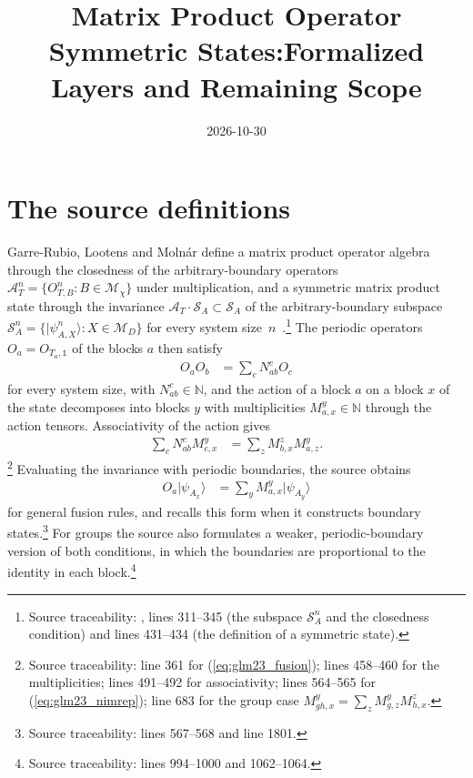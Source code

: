 \documentclass{article}
\title{Matrix Product Operator Symmetric States:\newline Formalized Layers and Remaining Scope}
\author{}
\date{2026-10-30}
\begin{document}
\maketitle
{}

\section{The source definitions}
Garre-Rubio, Lootens and Moln\'ar define a matrix product operator
algebra through the closedness of the arbitrary-boundary operators
$\mathcal A_T^n=\{O^n_{T,B}: B\in\mathcal M_\chi\}$ under multiplication,
and a symmetric matrix product state through the invariance
$\mathcal A_T\cdot\mathcal S_A\subset\mathcal S_A$ of the arbitrary-boundary
subspace $\mathcal S_A^n=\{\lvert\psi^n_{A,X}\rangle: X\in\mathcal M_D\}$ for every
system size~$n$~\cite{GarreRubio2023MPOSym}.\footnote{Source traceability:
    , lines 311--345 (the subspace
    $\mathcal S_A^n$ and the closedness condition) and lines 431--434
    (the definition of a symmetric state).}
The periodic operators $O_a=O_{T_a,\mathbb 1}$ of the blocks $a$ then
satisfy
\begin{align}
    O_aO_b & =\sum_c N_{ab}^c O_c
    \label{eq:glm23_fusion}
\end{align}
for every system size, with $N_{ab}^c\in\mathbb N$, and the action of a block
$a$ on a block $x$ of the state decomposes into blocks $y$ with multiplicities
$M_{a,x}^y\in\mathbb N$ through the action tensors. Associativity of the action
gives
\begin{align}
    \sum_c N_{ab}^c M_{c,x}^y & =\sum_z M_{b,x}^z M_{a,z}^y .
    \label{eq:glm23_nimrep}
\end{align}
\footnote{Source traceability: line 361 for
    (\ref{eq:glm23_fusion}); lines 458--460 for the multiplicities; lines
    491--492 for associativity; lines 564--565 for
    (\ref{eq:glm23_nimrep}); line 683 for the group case
    $M_{gh,x}^y=\sum_z M_{g,z}^y M_{h,x}^z$.}
Evaluating the invariance with periodic boundaries, the source obtains
\begin{align}
    O_a\lvert\psi_{A_x}\rangle & =\sum_y M_{a,x}^y\lvert\psi_{A_y}\rangle
    \label{eq:glm23_periodic_symmetry}
\end{align}
for general fusion rules, and recalls this form when it constructs boundary
states.\footnote{Source traceability: lines 567--568 and line 1801.}
For groups the source also formulates a weaker, periodic-boundary version
of both conditions, in which the boundaries are proportional to the identity
in each block.\footnote{Source traceability: lines 994--1000 and 1062--1064.}
\end{document}
